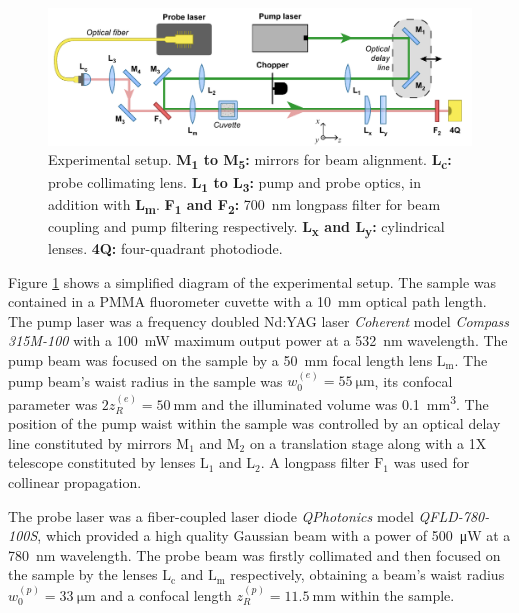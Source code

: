 \documentclass[9pt,twocolumn,twoside]{osajnl}
\newcommand{\low}[1]{\textsubscript{#1}}
\begin{document}
\begin{figure}[ht]
	\centering \includegraphics[width=\textwidth]{figures/Setup.pdf}
	\caption{Experimental setup. \textbf{M\low{1} to M\low{5}:} mirrors for beam alignment. \textbf{L\low{c}:} probe collimating lens. \textbf{L\low{1} to L\low{3}:} pump and probe optics, in addition with \textbf{L\low{m}}. \textbf{F\low{1} and F\low{2}:} \SI{700}{\nano\metre} longpass filter for beam coupling and pump filtering respectively. \textbf{L\low{x} and L\low{y}:} cylindrical lenses. \textbf{4Q:} four-quadrant photodiode.}
	\label{fig:Experimental}
\end{figure}

Figure \ref{fig:Experimental} shows a simplified diagram of the experimental setup. The sample was contained in a PMMA fluorometer cuvette with a \SI{10}{\milli\metre} optical path length. The pump laser was a frequency doubled Nd:YAG laser \emph{Coherent} model \emph{Compass 315M-100} with a \SI{100}{\milli\watt} maximum output power at a \SI{532}{\nano\metre} wavelength. The pump beam was focused on the sample by a \SI{50}{\milli\metre} focal length lens $\mathrm{L_m}$. The pump beam's waist radius in the sample was $w_0^{(e)} = \SI{55}{\micro\metre}$, its confocal parameter was $2z_R^{(e)} = \SI{50}{\milli\metre}$ and the illuminated volume was \SI{0.1}{\milli\metre^3}. The position of the pump waist within the sample was controlled by an optical delay line constituted by mirrors $\mathrm{M_1}$ and $\mathrm{M_2}$ on a translation stage along with a 1X telescope constituted by lenses $\mathrm{L_1}$ and $\mathrm{L_2}$. A longpass filter $\mathrm{F_1}$ was used for collinear propagation.

The probe laser was a fiber-coupled laser diode \emph{QPhotonics} model \emph{QFLD-780-100S}, which provided a high quality Gaussian beam with a power of \SI{500}{\micro\watt} at a \SI{780}{\nano\metre} wavelength. The probe beam was firstly collimated and then focused on the sample by the lenses $\mathrm{L_c}$ and $\mathrm{L_m}$ respectively, obtaining a beam's waist radius $w_0^{(p)} = \SI{33}{\micro\metre}$ and a confocal length $z_R^{(p)} = \SI{11.5}{\milli\metre}$ within the sample. 
\end{document}

